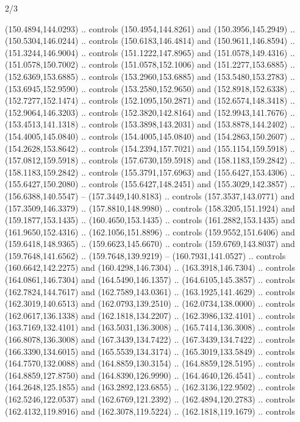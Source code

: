\begin{flagdescription}{2/3}
\begin{scope}[xshift=0.5\flaglength,yshift=0.5\flagwidth,scale=\flagwidth/180]
\begin{scope}[y=0.8pt, x=0.8pt, yscale=-1,shift={(-168.75,-108.75)}]
  (150.4894,144.0293) .. controls (150.4954,144.8261) and (150.3956,145.2949) ..
  (150.5304,146.0244) .. controls (150.6183,146.4814) and (150.9611,146.8594) ..
  (151.3244,146.9004) .. controls (151.1222,147.8965) and (151.0578,149.4316) ..
  (151.0578,150.7002) .. controls (151.0578,152.1006) and (151.2277,153.6885) ..
  (152.6369,153.6885) .. controls (153.2960,153.6885) and (153.5480,153.2783) ..
  (153.6945,152.9590) .. controls (153.2580,152.9650) and (152.8918,152.6338) ..
  (152.7277,152.1474) .. controls (152.1095,150.2871) and (152.6574,148.3418) ..
  (152.9064,146.3203) .. controls (152.3820,142.8164) and (152.9943,141.7676) ..
  (153.4513,141.1318) .. controls (153.3898,143.2031) and (153.8878,144.2402) ..
  (154.4005,145.0840) .. controls (154.4005,145.0840) and (154.2863,150.2607) ..
  (154.2628,153.8642) .. controls (154.2394,157.7021) and (155.1154,159.5918) ..
  (157.0812,159.5918) .. controls (157.6730,159.5918) and (158.1183,159.2842) ..
  (158.1183,159.2842) .. controls (155.3791,157.6963) and (155.6427,153.4306) ..
  (155.6427,150.2080) .. controls (155.6427,148.2451) and (155.3029,142.3857) ..
  (156.6388,140.5547) -- (157.3449,140.8183) .. controls (157.3537,143.0771) and
  (157.3509,146.3379) .. (157.8810,148.9980) .. controls (158.3205,151.1924) and
  (159.1877,153.1435) .. (160.4650,153.1435) .. controls (161.2882,153.1435) and
  (161.9650,152.4316) .. (162.1056,151.8896) .. controls (159.9552,151.6406) and
  (159.6418,148.9365) .. (159.6623,145.6670) .. controls (159.6769,143.8037) and
  (159.7648,141.6562) .. (159.7648,139.9219) -- (160.7931,141.0527) .. controls
  (160.6642,142.2275) and (160.4298,146.7304) .. (163.3918,146.7304) .. controls
  (164.0861,146.7304) and (164.5490,146.1357) .. (164.6105,145.3857) .. controls
  (162.7824,144.7617) and (162.7589,143.0361) .. (163.1925,141.4629) .. controls
  (162.3019,140.6513) and (162.0793,139.2510) .. (162.0734,138.0000) .. controls
  (162.0617,136.1338) and (162.1818,134.2207) .. (162.3986,132.4101) .. controls
  (163.7169,132.4101) and (163.5031,136.3008) .. (165.7414,136.3008) .. controls
  (166.8078,136.3008) and (167.3439,134.7422) .. (167.3439,134.7422) .. controls
  (166.3390,134.6015) and (165.5539,134.3174) .. (165.3019,133.5849) .. controls
  (164.7570,132.0088) and (164.8859,130.3154) .. (164.8859,128.5195) .. controls
  (164.8859,127.8750) and (164.8390,126.9990) .. (164.4640,126.4541) .. controls
  (164.2648,125.1855) and (163.2892,123.6855) .. (162.3136,122.9502) .. controls
  (162.5246,122.0537) and (162.6769,121.2392) .. (162.4894,120.2783) .. controls
  (162.4132,119.8916) and (162.3078,119.5224) .. (162.1818,119.1679) .. controls

\end{scope}
\end{scope}
\end{flagdescription}
